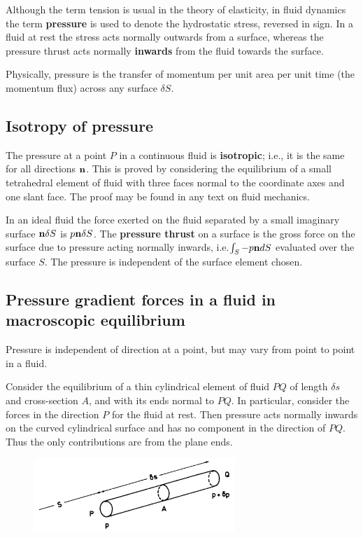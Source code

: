 \documentclass[twoside,a4paper,11pt]{report}
\begin{document}
Although the term tension is usual in the theory of elasticity, in fluid 
dynamics the term \textbf{pressure} is used to denote the hydrostatic 
stress, reversed in sign. In a fluid at rest the stress acts normally 
outwards from a surface, whereas the pressure thrust acts normally 
\textbf{inwards} from the fluid towards the surface.

Physically, pressure is the transfer of momentum per unit area per unit time 
(the momentum flux) across any surface $\delta S$.

\subsection{Isotropy of pressure}
The pressure at a point $P$ in a continuous fluid is \textbf{isotropic}; i.e., 
it is the same for all directions ${\bf n}$. This is proved by considering 
the equilibrium of a small tetrahedral element of fluid with three faces 
normal to the coordinate axes and one slant face. The proof may be found in 
any text on fluid mechanics.

In an ideal fluid the force exerted on the fluid separated by a small 
imaginary surface ${\bf n}\delta S$ is $p{\bf n}\delta S$. The 
\textbf{pressure thrust} on a surface is the gross force on the surface due 
to pressure acting normally inwards, i.e.$\int_S {-p{{\bf n}}dS} 
$ evaluated over the surface $S$. The pressure is independent  of the 
surface element chosen.

\subsection{Pressure gradient forces in a fluid in macroscopic equilibrium}
Pressure is independent of direction at a point, but may vary from point to 
point in a fluid.

Consider the equilibrium of a thin cylindrical element of fluid $PQ$ of length 
$\delta s$ and cross-section $A$, and with its ends normal to $PQ$. In particular, 
consider the 
forces in the direction $P$ for the fluid at rest. Then pressure acts normally 
inwards on the curved cylindrical surface and has no component in the 
direction of $PQ$. Thus the only contributions are from the plane ends.

\begin{figure}[htbp]
\centerline{\includegraphics[width=3in]{Section25.pdf}}
\label{fig5}
\end{figure}
\end{document}
